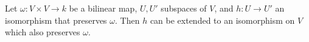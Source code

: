 \begin{lemma}
Let $\omega\colon V\times V\to k$ be a bilinear map, $U,U'$ subspaces of $V$, and $h\colon U\to U'$ an isomorphism that preserves $\omega$. Then $h$ can be extended to an isomorphism on $V$ which also preserves $\omega$.
\end{lemma}